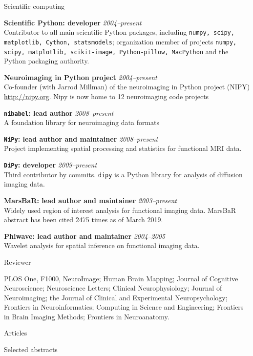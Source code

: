 \documentclass{cv}
\newcommand{\PlaceDateNote}[3]{{\bf #1} \hfill {\em #2} \\#3}
\newcommand{\Pkg}[1]{{\tt #1}}
\begin{document}
\begin{cvSection}{Scientific computing}

\PlaceDateNote{Scientific Python: developer}{2004--present}
{Contributor to all main scientific Python packages, including
    \Pkg{numpy, scipy, matplotlib, Cython, statsmodels}; organization member
    of projects \Pkg{numpy, scipy, matplotlib, scikit-image, Python-pillow,
MacPython} and the Python packaging authority.}

\PlaceDateNote{Neuroimaging in Python project}{2004--present}
{Co-founder (with Jarrod Millman) of the neuroimaging in Python project (NIPY)
    \url{http://nipy.org}.  Nipy is now home to 12 neuroimaging
    code projects}

\PlaceDateNote{\Pkg{nibabel}: lead author}{2008--present}
    {A foundation library for neuroimaging data formats}

\PlaceDateNote{\Pkg{NiPy}: lead author and maintainer}{2008--present}
    {Project implementing spatial processing and statistics for functional MRI
    data.}

\PlaceDateNote{\Pkg{DiPy}: developer}{2009--present}
    {Third contributor by commits.  \Pkg{dipy} is a Python library for
    analysis of diffusion imaging data}.

\PlaceDateNote{MarsBaR: lead author and maintainer}{2003--present}
{Widely used region of interest analysis for functional
    imaging data.  MarsBaR abstract has been
cited 2475 times as of March 2019.}

\PlaceDateNote{Phiwave: lead author and maintainer}{2004--2005}
{Wavelet analysis for spatial inference on
    functional imaging data.}

\end{cvSection}

\begin{cvSection}{Reviewer}

    PLOS One, F1000, NeuroImage; Human Brain Mapping; Journal of Cognitive
    Neuroscience; Neuroscience Letters; Clinical Neurophysiology; Journal of
    Neuroimaging; the Journal of Clinical and Experimental Neuropsychology;
    Frontiers in Neuroinformatics; Computing in Science and Engineering;
    Frontiers in Brain Imaging Methods; Frontiers in Neuroanatomy.

\end{cvSection}

\begin{cvSection}{Articles}

\printbibliography[heading=none,
    keyword=article,
    notkeyword=omit]

\end{cvSection}

\begin{cvSection}{Selected abstracts}

\printbibliography[heading=none,
    keyword=abstract,
    notkeyword=omit]

\end{cvSection}
\end{document}
